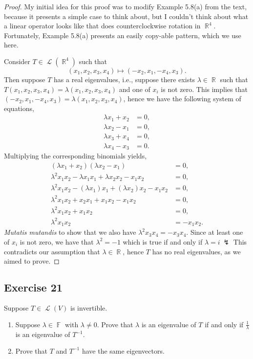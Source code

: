 \documentclass[letterpaper, 12pt]{amsart}
\DeclareMathOperator{\R}{\mathbb{R}}				%
\DeclareMathOperator{\F}{\mathbb{F}}				%
\DeclareMathOperator{\Ell}{\mathscr{L}}				%
\theoremstyle{definition}  							%
\begin{document}
		\begin{proof}
		My initial idea for this proof was to modify Example 5.8(a) from the text, because it presents a simple case to think about, but I couldn't think about what a linear operator looks like that does counterclockwise rotation in $\R^{4}$.
		Fortunately, Example 5.8(a) presents an easily copy-able pattern, which we use here.

		Consider $T \in \Ell(\R^{4})$ such that $$(x_{1},x_{2},x_{3},x_{4}) \mapsto (-x_{2},x_{1},-x_{4},x_{3}).$$
		Then suppose $T$ has a real eigenvalues, i.e., suppose there exists $\lambda \in \R$ such that $T(x_{1},x_{2},x_{3},x_{4}) = \lambda(x_{1},x_{2},x_{3},x_{4})$ and one of $x_{i}$ is not zero.
		This implies that $(-x_{2},x_{1},-x_{4},x_{3}) = \lambda(x_{1},x_{2},x_{3},x_{4})$, hence we have the following system of equations,
			\begin{align*}
				\lambda x_{1} + x_{2} &= 0, \\
				\lambda x_{2} - x_{1} &= 0, \\
				\lambda x_{3} + x_{4} &= 0, \\
				\lambda x_{4} - x_{3} &= 0.
			\end{align*}
		Multiplying the corresponding binomials yields,
			\begin{align*}
			(\lambda x_{1} + x_{2})(\lambda x_{2} - x_{1}) &= 0, \\
			\lambda^{2}x_{1}x_{2} - \lambda x_{1}x_{1} + \lambda x_{2}x_{2} - x_{1}x_{2} &= 0, \\
			\lambda^{2}x_{1}x_{2} - (\lambda x_{1})x_{1} + (\lambda x_{2}) x_{2} - x_{1}x_{2} &= 0, \\
			\lambda^{2}x_{1}x_{2} + x_{2}x_{1} + x_{1}x_{2} - x_{1}x_{2} &= 0, \\
			\lambda^{2}x_{1}x_{2} + x_{1}x_{2} &=0, \\
			\lambda^{2}x_{1}x_{2} &= - x_{1}x_{2}.
			\end{align*}
		\textit{Mutatis mutandis} to show that we also have $\lambda^{2}x_{3}x_{4} = - x_{3}x_{4}$.
		Since at least one of $x_{i}$ is not zero, we have that $\lambda^{2} = -1$ which is true if and only if $\lambda = i \ \lightning$
		This contradicts our assumption that $\lambda \in \R$, hence $T$ has no real eigenvalues, as we aimed to prove.
		\end{proof}

		\subsection*{Exercise 21}
		Suppose $T \in \Ell(V)$ is invertible.
		\begin{enumerate}[\hspace{5mm} (a)]
			\item Suppose $\lambda \in \F$ with $\lambda \neq 0$.
			Prove that $\lambda$ is an eigenvalue of $T$ if and only if $\tfrac{1}{\lambda}$ is an eigenvalue of $T^{-1}$.

			\item Prove that $T$ and $T^{-1}$ have the same eigenvectors.
		\end{enumerate}
		
\end{document}
